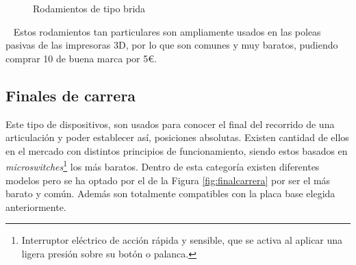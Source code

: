 \begin{figure} [ht!]
  \centering  
  \hspace{0.5cm}
  \caption{Rodamientos de tipo brida}
\end{figure}\ 
\newpage
Estos rodamientos tan particulares son ampliamente usados en las poleas pasivas de las impresoras 3D, por lo 
que son comunes y muy baratos, pudiendo comprar 10 de buena marca por 5\euro.

\subsection{Finales de carrera}
\noindent Este tipo de dispositivos, son usados para conocer el final del recorrido de una articulación y poder establecer así, posiciones 
absolutas.
Existen cantidad de ellos en el mercado con distintos principios de funcionamiento, siendo estos basados en 
\textit{microswitches}\footnote{Interruptor eléctrico de acción rápida y sensible, 
que se activa al aplicar una ligera presión sobre su botón o palanca.} los más baratos. Dentro 
de esta categoría existen diferentes modelos pero se ha optado por el de la Figura \ref{fig:finalcarrera} por ser el más barato y común. Además son 
totalmente compatibles con la placa base elegida anteriormente.

